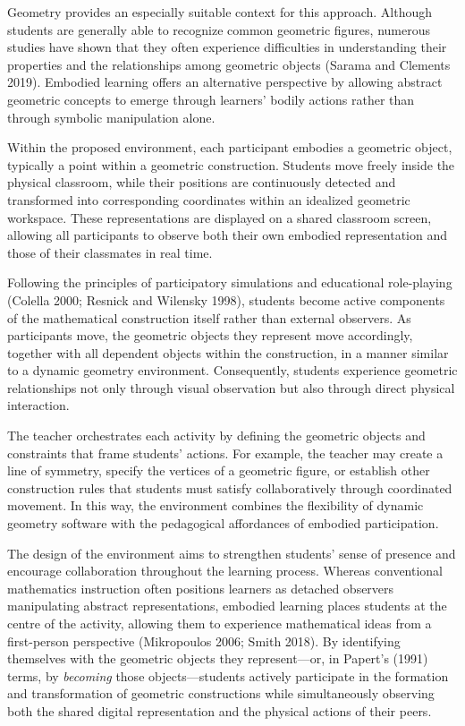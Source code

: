 Geometry provides an especially suitable context for this approach.
Although students are generally able to recognize common geometric
figures, numerous studies have shown that they often experience
difficulties in understanding their properties and the relationships
among geometric objects (Sarama and Clements 2019). Embodied learning
offers an alternative perspective by allowing abstract geometric
concepts to emerge through learners' bodily actions rather than through
symbolic manipulation alone.

Within the proposed environment, each participant embodies a geometric
object, typically a point within a geometric construction. Students move
freely inside the physical classroom, while their positions are
continuously detected and transformed into corresponding coordinates
within an idealized geometric workspace. These representations are
displayed on a shared classroom screen, allowing all participants to
observe both their own embodied representation and those of their
classmates in real time.

Following the principles of participatory simulations and educational
role-playing (Colella 2000; Resnick and Wilensky 1998), students become
active components of the mathematical construction itself rather than
external observers. As participants move, the geometric objects they
represent move accordingly, together with all dependent objects within
the construction, in a manner similar to a dynamic geometry environment.
Consequently, students experience geometric relationships not only
through visual observation but also through direct physical interaction.

The teacher orchestrates each activity by defining the geometric objects
and constraints that frame students' actions. For example, the teacher
may create a line of symmetry, specify the vertices of a geometric
figure, or establish other construction rules that students must satisfy
collaboratively through coordinated movement. In this way, the
environment combines the flexibility of dynamic geometry software with
the pedagogical affordances of embodied participation.

The design of the environment aims to strengthen students' sense of
presence and encourage collaboration throughout the learning process.
Whereas conventional mathematics instruction often positions learners as
detached observers manipulating abstract representations, embodied
learning places students at the centre of the activity, allowing them to
experience mathematical ideas from a first-person perspective
(Mikropoulos 2006; Smith 2018). By identifying themselves with the
geometric objects they represent---or, in Papert's (1991) terms, by
\emph{becoming} those objects---students actively participate in the
formation and transformation of geometric constructions while
simultaneously observing both the shared digital representation and the
physical actions of their peers.

